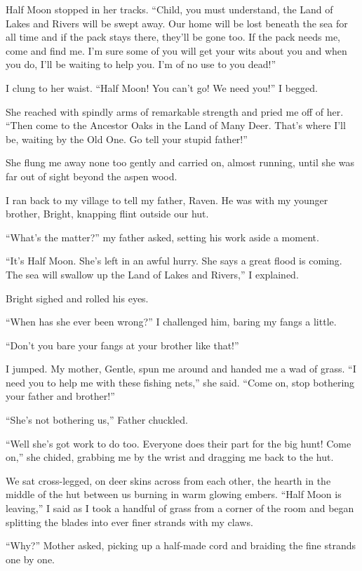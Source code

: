 Half Moon stopped in her tracks. ``Child, you must understand, the Land of Lakes and Rivers will be swept away. Our home will be lost beneath the sea for all time and if the pack stays there, they'll be gone too. If the pack needs me, come and find me. I'm sure some of you will get your wits about you and when you do, I'll be waiting to help you. I'm of no use to you dead!''

I clung to her waist. ``Half Moon! You can't go! We need you!'' I begged.

She reached with spindly arms of remarkable strength and pried me off of her. ``Then come to the Ancestor Oaks in the Land of Many Deer. That's where I'll be, waiting by the Old One. Go tell your stupid father!''

She flung me away none too gently and carried on, almost running, until she was far out of sight beyond the aspen wood.

I ran back to my village to tell my father, Raven. He was with my younger brother, Bright, knapping flint outside our hut.

``What's the matter?'' my father asked, setting his work aside a moment.

``It's Half Moon. She's left in an awful hurry. She says a great flood is coming. The sea will swallow up the Land of Lakes and Rivers,'' I explained.

Bright sighed and rolled his eyes.

``When has she ever been wrong?'' I challenged him, baring my fangs a little.

``Don't you bare your fangs at your brother like that!''

I jumped. My mother, Gentle, spun me around and handed me a wad of grass. ``I need you to help me with these fishing nets,'' she said. ``Come on, stop bothering your father and brother!''

``She's not bothering us,'' Father chuckled.

``Well she's got work to do too. Everyone does their part for the big hunt! Come on,'' she chided, grabbing me by the wrist and dragging me back to the hut.

We sat cross-legged, on deer skins across from each other, the hearth in the middle of the hut between us burning in warm glowing embers. ``Half Moon is leaving,'' I said as I took a handful of grass from a corner of the room and began splitting the blades into ever finer strands with my claws.

``Why?'' Mother asked, picking up a half-made cord and braiding the fine strands one by one.

